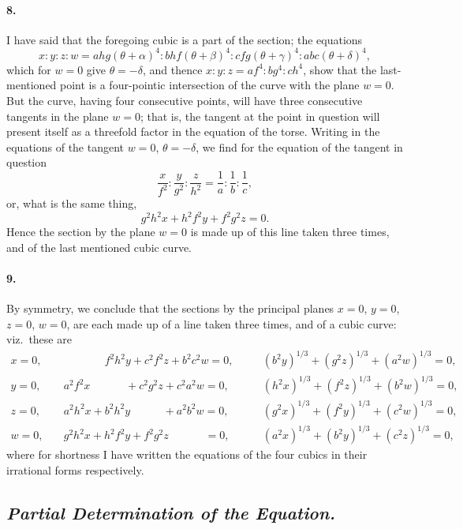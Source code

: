 \documentclass[11pt,a4paper]{article}
\begin{document}
\paragraph{8.}
I have said that the foregoing cubic is a part of the section; the equations
\[
x : y : z : w = ahg(\theta + \alpha)^4 : bhf(\theta + \beta)^4 :
   cfg(\theta + \gamma)^4 : abc(\theta + \delta)^4,
\]
which for $w = 0$ give $\theta = -\delta$, and thence $x : y : z = af^4 : bg^4 : ch^4$,
show that the last-mentioned point is a four-pointic intersection of the curve with the
plane $w = 0$. But the curve, having four consecutive points, will have three consecutive
tangents in the plane $w = 0$; that is, the tangent at the point in question will present
itself as a threefold factor in the equation of the torse. Writing in the equations of
the tangent $w = 0$, $\theta = -\delta$, we find for the equation of the tangent in question
\[
\frac{x}{f^2} : \frac{y}{g^2} : \frac{z}{h^2} = \frac{1}{a} : \frac{1}{b} : \frac{1}{c},
\]
or, what is the same thing,
\[
g^2 h^2 x + h^2 f^2 y + f^2 g^2 z = 0.
\]
Hence the section by the plane $w = 0$ is made up of this line taken three times, and
of the last mentioned cubic curve.

\paragraph{9.}
By symmetry, we conclude that the sections by the principal planes $x = 0$, $y = 0$,
$z = 0$, $w = 0$, are each made up of a line taken three times, and of a cubic curve:
viz.\ these are
\[
\begin{aligned}
x = 0,\quad & \phantom{a^2 h^2 x +} f^2 h^2 y + c^2 f^2 z + b^2 c^2 w = 0,\quad
            && (b^2 y)^{1/3} + (g^2 z)^{1/3} + (a^2 w)^{1/3} = 0,\\
y = 0,\quad & a^2 f^2 x \phantom{+ a^2 h^2 y} + c^2 g^2 z + c^2 a^2 w = 0,\quad
            && (h^2 x)^{1/3} + (f^2 z)^{1/3} + (b^2 w)^{1/3} = 0,\\
z = 0,\quad & a^2 h^2 x + b^2 h^2 y \phantom{+ c^2 g^2 z} + a^2 b^2 w = 0,\quad
            && (g^2 x)^{1/3} + (f^2 y)^{1/3} + (c^2 w)^{1/3} = 0,\\
w = 0,\quad & g^2 h^2 x + h^2 f^2 y + f^2 g^2 z \phantom{+ a^2 b^2 w} = 0,\quad
            && (a^2 x)^{1/3} + (b^2 y)^{1/3} + (c^2 z)^{1/3} = 0,
\end{aligned}
\]
where for shortness I have written the equations of the four cubics in their irrational
forms respectively.

\subsection*{\textit{Partial Determination of the Equation.}}
\end{document}
